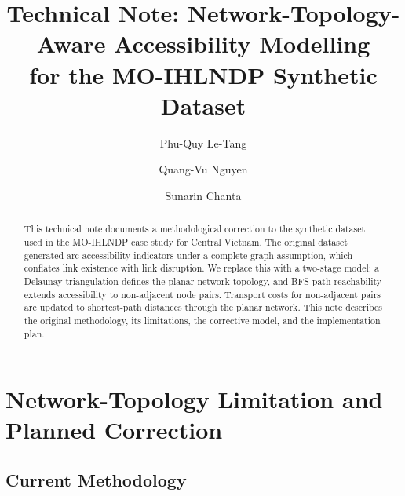 \documentclass{llncs}
\begin{document}
\title{Technical Note: Network-Topology-Aware Accessibility Modelling\\
       for the MO-IHLNDP Synthetic Dataset}


\author{
    Phu-Quy Le-Tang \and
    Quang-Vu Nguyen \and
    Sunarin Chanta
}



\maketitle

\begin{abstract}
This technical note documents a methodological correction to the synthetic
dataset used in the MO-IHLNDP case study for Central Vietnam.
The original dataset generated arc-accessibility indicators under a
complete-graph assumption, which conflates link existence with link disruption.
We replace this with a two-stage model: a Delaunay triangulation defines the
planar network topology, and BFS path-reachability extends accessibility to
non-adjacent node pairs.
Transport costs for non-adjacent pairs are updated to shortest-path distances
through the planar network.
This note describes the original methodology, its limitations, the corrective
model, and the implementation plan.
\end{abstract}



\section{Network-Topology Limitation and Planned Correction}
\label{sec:topology-correction}

\subsection{Current Methodology}
\label{sec:current}
\end{document}
